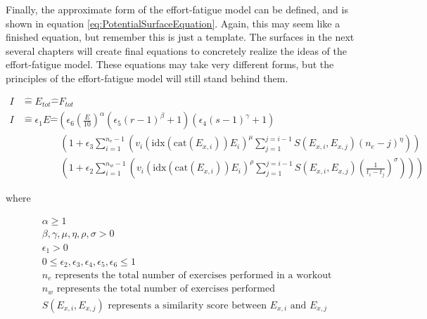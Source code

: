 Finally, the approximate form of the effort-fatigue model can be defined, and is shown in equation \ref{eq:PotentialSurfaceEquation}. Again, this may seem like a finished equation, but remember this is just a template. The surfaces in the next several chapters will create final equations to concretely realize the ideas of the effort-fatigue model. These equations may take very different forms, but the principles of the effort-fatigue model will still stand behind them.

\begin{minipage}{\textwidth}
	\begin{equation}
		\label{eq:PotentialSurfaceEquation}
		\begin{split}
			I & \hat{=} E_{tot} \hat{-} F_{tot} \\
			I & \hat{=} \epsilon_1 E \hat{-} 
				\left(
					\epsilon_6 \left( \frac{E}{10} \right)^\alpha
					\left( \epsilon_5 (r-1)^\beta + 1 \right)
					\left( \epsilon_4 (s-1)^\gamma+1 \right)
					\right.
					\\
					& \;\;\;\;\;\;\;\;\;\;\;\;\;\;
					\left(
						1+\epsilon_3 \sum_{i=1}^{n_e-1} \left( 
							v_i \left(
								\text{idx}(\text{cat}(E_{x,i})) E_i
							\right)^\mu
							\sum_{j=1}^{j=i-1} S(E_{x,i},E_{x,j})(n_e-j)^\eta
						\right)
					\right)
					\\
					& \;\;\;\;\;\;\;\;\;\;\;\;\;\;
					\left.
					\left(
						1+\epsilon_2 \sum_{i=1}^{n_w-1} \left( 
							v_i \left(
								\text{idx}(\text{cat}(E_{x,i})) E_i
							\right)^\rho
							\sum_{j=1}^{j=i-1} S(E_{x,i},E_{x,j})\left(
								\frac{1}{t_i-t_j}
							\right)^\sigma
						\right)
					\right)
				\right)
		\end{split}
	\end{equation}
	\centerline{where}
	\begin{equation*}
		\begin{split}
		    & \alpha \ge 1 \\
		    & \beta,\gamma, \mu, \eta, \rho, \sigma > 0 \\
		    & \epsilon_1 >0 \\
			& 0 \le \epsilon_2, \epsilon_3, \epsilon_4, \epsilon_5, \epsilon_6 \le 1 \\
			& n_e \text{ represents the total number of exercises performed in a workout} \\
			& n_w \text{ represents the total number of exercises performed} \\
			& S(E_{x,i},E_{x,j}) \text{ represents a similarity score between } E_{x,i} \text{ and } E_{x,j} \\
		\end{split}
	\end{equation*}
\end{minipage}







